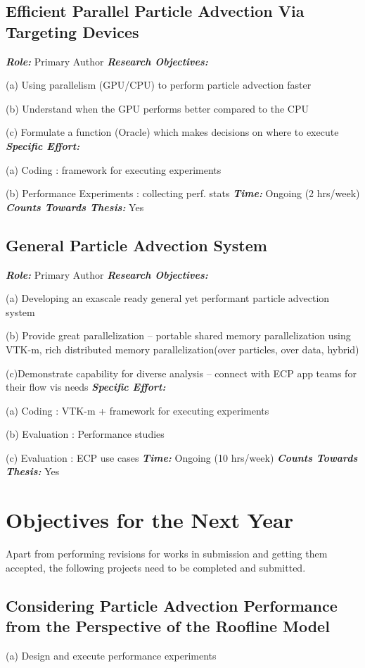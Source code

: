 \documentclass{article}
\newcommand{\boit}[1]{\textbf{\textit{#1}}}
\begin{document}
\subsection{Efficient Parallel Particle Advection Via Targeting Devices}
\noindent \boit{Role:} Primary Author
\noindent \boit{Research Objectives:}

(a) Using parallelism (GPU/CPU) to perform particle advection faster

(b) Understand when the GPU performs better compared to the CPU

(c) Formulate a function (Oracle) which makes decisions on where to execute
\noindent \boit{Specific Effort:}

(a) Coding : framework for executing experiments

(b) Performance Experiments : collecting perf. stats
\noindent \boit{Time:}
Ongoing (2 hrs/week)
\noindent \boit{Counts Towards Thesis:} Yes

\subsection{General Particle Advection System}
\noindent \boit{Role:} Primary Author
\noindent \boit{Research Objectives:}

(a) Developing an exascale ready general yet performant particle advection system

(b) Provide great parallelization -- portable shared memory parallelization using VTK-m,
rich distributed memory parallelization(over particles, over data, hybrid)

(c)Demonstrate capability for diverse analysis -- connect with ECP app teams for their flow vis needs
\noindent \boit{Specific Effort:}

(a) Coding : VTK-m + framework for executing experiments

(b) Evaluation : Performance studies

(c) Evaluation : ECP use cases
\noindent \boit{Time:}
Ongoing (10 hrs/week)
\noindent \boit{Counts Towards Thesis:} Yes

\section{Objectives for the Next Year}

Apart from performing revisions for works in submission and getting them accepted,
the following projects need to be completed and submitted. 

\subsection{Considering Particle Advection Performance from the Perspective of the Roofline Model}
(a) Design and execute performance experiments
\end{document}
